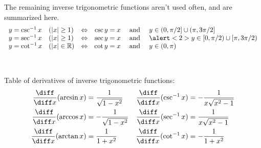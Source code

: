 \begin{frame}
The remaining inverse trigonometric functions aren't used often, and are summarized here.
\[
\begin{array}{llcrcl}
y = \csc^{-1} x &%
(|x| \geq 1) &%
\Leftrightarrow &%
\csc y = x &%
\text{ and } &%
y\in (0,\pi /2] \cup (\pi , 3\pi /2] \\%
y = \sec^{-1} x &%
(|x| \geq 1) &%
\Leftrightarrow &%
\sec y = x &%
\text{ and } &%
\alert<2>{y\in [0,\pi /2) \cup [\pi , 3\pi /2)} \\%
y = \cot^{-1} x &%
(|x| \in \mathbb{R}) &%
\Leftrightarrow &%
\cot y = x &%
\text{ and } &%
y\in (0,\pi )
\end{array}
\]

\ %
%
\end{frame}

\begin{frame}
Table of derivatives of inverse trigonometric functions: 
\begin{align*}
\frac{\diff}{\diff x} (\arcsin x) & = %
\frac{1}{\sqrt{1-x^2}} &%
\frac{\diff}{\diff x} (\csc^{-1} x) & = %
-\frac{1}{x\sqrt{x^2-1}} \\%
\frac{\diff}{\diff x} (\arccos x) & = %
-\frac{1}{\sqrt{1-x^2}} &%
\frac{\diff}{\diff x} (\sec^{-1} x) & = %
\frac{1}{x\sqrt{x^2-1}} \\%
\frac{\diff}{\diff x} (\arctan x) & = %
\frac{1}{1+x^2} &%
\frac{\diff}{\diff x} (\cot^{-1} x) & = %
-\frac{1}{1+x^2} %
\end{align*}
\end{frame}
